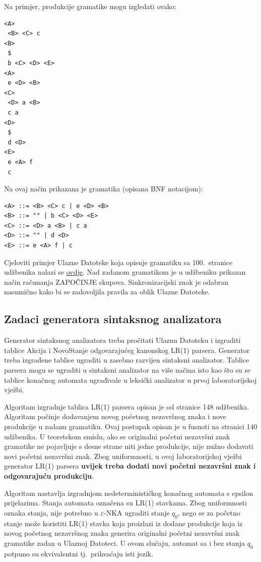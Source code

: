 \documentclass[times, 12pt, utf8]{book}
\begin{document}
Na primjer, produkcije gramatike mogu izgledati ovako:
\begin{lstlisting}[caption={Primjer produkcija gramatike.},label=lst:produkcije_gramatike_primjer]
<A>
 <B> <C> c
<B>
 $
 b <C> <D> <E>
<A>
 e <D> <B>
<C>
 <D> a <B>
 c a
<D>
 $
 d <D>
<E>
 e <A> f
 c
\end{lstlisting}

Na ovaj način prikazana je gramatika (opisana BNF notacijom):
\begin{lstlisting}[caption={Primjer produkcija gramatike u BNF notaciji.},label=lst:produkcije_gramatike_primjer_bnf]
<A> ::= <B> <C> c | e <D> <B>
<B> ::= "" | b <C> <D> <E>
<C> ::= <D> a <B> | c a
<D> ::= "" | d <D>
<E> ::= e <A> f | c
\end{lstlisting}

Cjeloviti primjer Ulazne Datoteke koja opisuje gramatiku sa 100.~stranice udžbenika nalazi se \href{}{ovdje}.
Nad zadanom gramatikom je u udžbeniku prikazan način računanja ZAPOČINJE skupova.
Sinkronizacijski znak je odabran nasumično kako bi se zadovoljila pravila za oblik Ulazne Datoteke.

\subsection{Zadaci generatora sintaksnog analizatora}
Generator sintaksnog analizatora treba pročitati Ulaznu Datoteku i izgraditi tablice Akcija i NovoStanje odgovarajućeg kanonskog LR(1) parsera.
Generator treba izgrađene tablice ugraditi u zasebno razvijen sintaksni analizator.
Tablice parsera mogu se ugraditi u sintaksni analizator na više načina isto kao što su se tablice konačnog automata ugrađivale u leksički analizator u prvoj laboratorijskoj vježbi.

Algoritam izgradnje tablica LR(1) parsera opisan je od stranice 148 udžbenika.
Algoritam počinje dodavanjem novog početnog nezavršnog znaka i nove produkcije u zadanu gramatiku.
Ovaj postupak opisan je u fusnoti na stranici 140 udžbenika.
U teoretskom smislu, ako se originalni početni nezavršni znak gramatike ne pojavljuje s desne strane niti jedne produkcije, nije nužno dodavati novi početni nezavršni znak.
Zbog uniformnosti, u ovoj laboratorijskoj vježbi generator LR(1) parsera \textbf{uvijek treba dodati novi početni nezavršni znak i odgovarajuću produkciju}.

Algoritam nastavlja izgradnjom nedeterminističkog konačnog automata s epsilon prijelazima.
Stanja automata označena su LR(1) stavkama.
Zbog uniformnosti oznaka stanja, nije potrebno u $\varepsilon$-NKA ugraditi stanje $q_{0}$, nego se za početno stanje može koristiti LR(1) stavka koja proizlazi iz dodane produkcije koja iz novog početnog nezavršnog znaka generira originalni početni nezavršni znak gramatike zadan u Ulaznoj Datoteci.
U ovom slučaju, automat sa i bez stanja $q_{0}$ potpuno su ekvivalentni tj.~prihvaćaju isti jezik.
\end{document}
